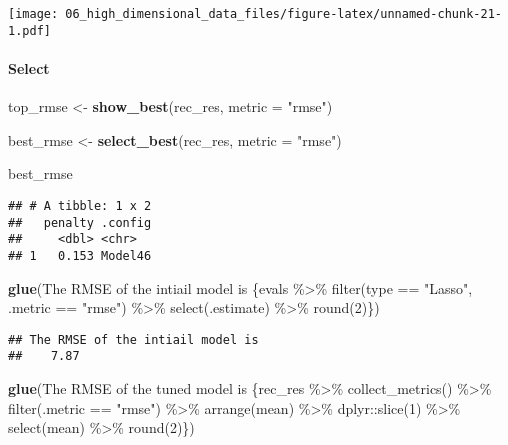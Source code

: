 \documentclass[
]{book}
\newenvironment{Shaded}{\begin{snugshade}}{\end{snugshade}}
\newcommand{\DataTypeTok}[1]{\textcolor[rgb]{0.13,0.29,0.53}{#1}}
\newcommand{\KeywordTok}[1]{\textcolor[rgb]{0.13,0.29,0.53}{\textbf{#1}}}
\newcommand{\NormalTok}[1]{#1}
\newcommand{\StringTok}[1]{\textcolor[rgb]{0.31,0.60,0.02}{#1}}
\begin{document}
\texttt{[image: 06\_high\_dimensional\_data\_files/figure-latex/unnamed-chunk-21-1.pdf]}

\hypertarget{select}{%
\paragraph{Select}\label{select}}

\begin{Shaded}
\begin{Highlighting}[]
\NormalTok{top\_rmse \textless{}{-}}\StringTok{ }\KeywordTok{show\_best}\NormalTok{(rec\_res, }\DataTypeTok{metric =} \StringTok{"rmse"}\NormalTok{)}

\NormalTok{best\_rmse \textless{}{-}}\StringTok{ }\KeywordTok{select\_best}\NormalTok{(rec\_res, }\DataTypeTok{metric =} \StringTok{"rmse"}\NormalTok{)}

\NormalTok{best\_rmse }
\end{Highlighting}
\end{Shaded}

\begin{verbatim}
## # A tibble: 1 x 2
##   penalty .config
##     <dbl> <chr>  
## 1   0.153 Model46
\end{verbatim}

\begin{Shaded}
\begin{Highlighting}[]
\KeywordTok{glue}\NormalTok{(}\StringTok{\textquotesingle{}The RMSE of the intiail model is }
\StringTok{     \{evals \%\textgreater{}\%}
\StringTok{  filter(type == "Lasso", .metric == "rmse") \%\textgreater{}\%}
\StringTok{  select(.estimate) \%\textgreater{}\%}
\StringTok{  round(2)\}\textquotesingle{}}\NormalTok{)}
\end{Highlighting}
\end{Shaded}

\begin{verbatim}
## The RMSE of the intiail model is 
##    7.87
\end{verbatim}

\begin{Shaded}
\begin{Highlighting}[]
\KeywordTok{glue}\NormalTok{(}\StringTok{\textquotesingle{}The RMSE of the tuned model is \{rec\_res \%\textgreater{}\%}
\StringTok{  collect\_metrics() \%\textgreater{}\%}
\StringTok{  filter(.metric == "rmse") \%\textgreater{}\%}
\StringTok{  arrange(mean) \%\textgreater{}\%}
\StringTok{  dplyr::slice(1) \%\textgreater{}\%}
\StringTok{  select(mean) \%\textgreater{}\%}
\StringTok{  round(2)\}\textquotesingle{}}\NormalTok{)}
\end{Highlighting}
\end{Shaded}
\end{document}

